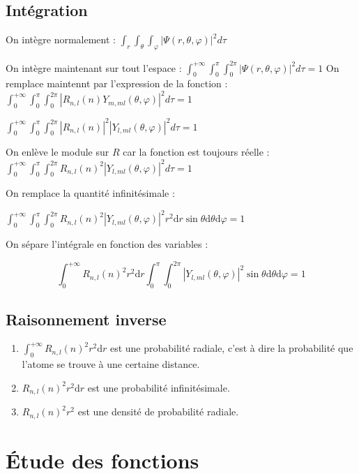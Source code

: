 \documentclass[french]{yLectureNote}
\begin{document}
\subsection{Intégration}
On intègre normalement :
$\int_r\int_{\theta}\int_{\varphi}|\Psi(r,\theta,\varphi)|^2 d\tau$

On intègre maintenant sur tout l'espace :
$\int_0^{+\infty}\int_0^{\pi}\int_0^{2\pi}|\Psi(r,\theta,\varphi)|^2 d\tau = 1$
On remplace maintennt par l'expression de la fonction : $\int_0^{+\infty}\int_0^{\pi}\int_0^{2\pi}|R_{n,l}(n)Y_{m,ml}(\theta,\varphi)|^2 d\tau = 1$

$\int_0^{+\infty}\int_0^{\pi}\int_0^{2\pi}|R_{n,l}(n)|^2|Y_{l,ml}(\theta,\varphi)|^2 d\tau = 1$

On enlève le module sur $R$ car la fonction est toujours réelle :
$\int_0^{+\infty}\int_0^{\pi}\int_0^{2\pi}R_{n,l}(n)^2|Y_{l,ml}(\theta,\varphi)|^2 d\tau = 1$

On remplace la quantité infinitésimale :

$\int_0^{+\infty}\int_0^{\pi}\int_0^{2\pi}R_{n,l}(n)^2|Y_{l,ml}(\theta,\varphi)|^2 r^2\mathrm{d}r \sin\theta \mathrm{d}\theta \mathrm{d} \varphi  = 1$

On sépare l'intégrale en fonction des variables :

\[\int_0^{+\infty}R_{n,l}(n)^2 r^2\mathrm{d}r \int_0^{\pi}\int_0^{2\pi}|Y_{l,ml}(\theta,\varphi)|^2  \sin\theta \mathrm{d}\theta \mathrm{d} \varphi  = 1\]

\subsection{Raisonnement inverse}
\begin{enumerate}
 \item $\int_0^{+\infty}R_{n,l}(n)^2 r^2\mathrm{d}r$ est une probabilité radiale, c'est à dire la probabilité que l'atome se trouve à une certaine distance.
 \item $R_{n,l}(n)^2 r^2\mathrm{d}r$ est une probabilité infinitésimale.
 \item $R_{n,l}(n)^2 r^2$ est une densité de probabilité radiale.
\end{enumerate}
\section{Étude des fonctions}
\end{document}
